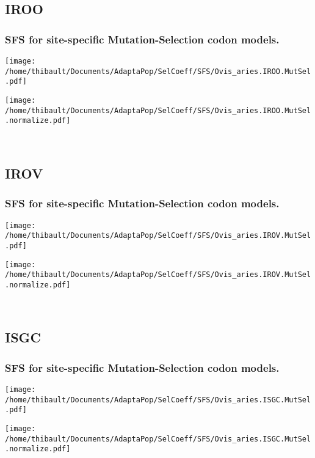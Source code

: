\subsection{IROO} 
 
\subsubsection*{SFS for site-specific Mutation-Selection codon models.} 
\begin{minipage}{0.49\linewidth} 
\texttt{[image: /home/thibault/Documents/AdaptaPop/SelCoeff/SFS/Ovis\_aries.IROO.MutSel.pdf]} 
\end{minipage}
\begin{minipage}{0.49\linewidth}
\texttt{[image: /home/thibault/Documents/AdaptaPop/SelCoeff/SFS/Ovis\_aries.IROO.MutSel.normalize.pdf]} 
\end{minipage}
\\ 
\subsection{IROV} 
 
\subsubsection*{SFS for site-specific Mutation-Selection codon models.} 
\begin{minipage}{0.49\linewidth} 
\texttt{[image: /home/thibault/Documents/AdaptaPop/SelCoeff/SFS/Ovis\_aries.IROV.MutSel.pdf]} 
\end{minipage}
\begin{minipage}{0.49\linewidth}
\texttt{[image: /home/thibault/Documents/AdaptaPop/SelCoeff/SFS/Ovis\_aries.IROV.MutSel.normalize.pdf]} 
\end{minipage}
\\ 
\subsection{ISGC} 
 
\subsubsection*{SFS for site-specific Mutation-Selection codon models.} 
\begin{minipage}{0.49\linewidth} 
\texttt{[image: /home/thibault/Documents/AdaptaPop/SelCoeff/SFS/Ovis\_aries.ISGC.MutSel.pdf]} 
\end{minipage}
\begin{minipage}{0.49\linewidth}
\texttt{[image: /home/thibault/Documents/AdaptaPop/SelCoeff/SFS/Ovis\_aries.ISGC.MutSel.normalize.pdf]} 
\end{minipage}
\\ 
